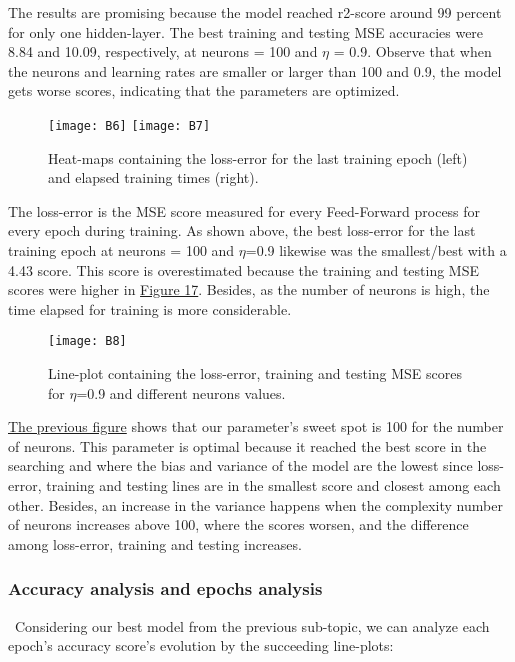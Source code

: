 The results are promising because the model reached r2-score around 99 percent for only one hidden-layer. The best training and testing MSE accuracies were 8.84 and 10.09, respectively, at neurons = 100 and $\eta$ = 0.9. Observe that when the neurons and learning rates are smaller or larger than 100 and 0.9, the model gets worse scores, indicating that the parameters are optimized.

\begin{figure}[H]
\label{fig:B4}
\centering
\texttt{[image: B6]}
\texttt{[image: B7]}
\caption{Heat-maps containing the loss-error for the last training epoch (left) and elapsed training times (right).}
\end{figure}

The loss-error is the MSE score measured for every Feed-Forward process for every epoch during training. As shown above, the best loss-error for the last training epoch at neurons = 100 and $\eta$=0.9 likewise was the smallest/best with a 4.43 score. This score is overestimated because the training and testing MSE scores were higher in \hyperref[fig:B3]{Figure 17}. Besides, as the number of neurons is high, the time elapsed for training is more considerable.

\begin{figure}[H]
\label{fig:B5}
\centering
\texttt{[image: B8]}
\caption{Line-plot containing the loss-error, training and testing MSE scores for $\eta$=0.9 and different neurons values.}
\end{figure}

\hyperref[fig:B5]{The previous figure} shows that our parameter's sweet spot is 100 for the number of neurons. This parameter is optimal because it reached the best score in the searching and where the bias and variance of the model are the lowest since loss-error, training and testing lines are in the smallest score and closest among each other. Besides, an increase in the variance happens when the complexity number of neurons increases above 100, where the scores worsen, and the difference among loss-error, training and testing increases.

\subsubsection{Accuracy analysis and epochs analysis}
\label{chap:Accuracy analysis and epochs analysis}

\quad \, Considering our best model from the previous sub-topic, we can analyze each epoch's accuracy score's evolution by the succeeding line-plots:


